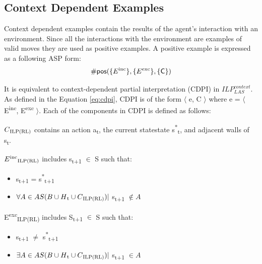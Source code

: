 \subsection{Context Dependent Examples}
Context dependent examples contain the results of the agent's interaction with an environment. 
Since all the interactions with the environment are examples of valid moves
they are used as positive examples. A positive example is expressed as a following ASP form:
\begin{equation}
\begin{split}
    \textsf{\#pos}(\{E\textsuperscript{inc}\}, \{E\textsuperscript{exc}\}, \textsf{\{C\}})
\end{split}
\end{equation}

It is equivalent to context-dependent partial interpretation (CDPI) in  $ILP_{LAS}^{context}$. 
As defined in the Equation \ref{eq:cdpi}, CDPI is of the form $\langle$ e, C $\rangle$ where e = $\langle$ E\textsuperscript{inc}, E\textsuperscript{exc} $\rangle$. 
Each of the components in CDPI is defined as follows:

\begin{defn}\label{def:ILPRL_context}
$C\textsubscript{ILP(RL)}$ contains an action a\textsubscript{t}, the current statestate s\textsuperscript{*}\textsubscript{t}, and adjacent walls of s\textsubscript{t}.
\label{def:context}
\end{defn}

\begin{defn} \label{def:ILPRL_inc}
$E\textsuperscript{inc}\textsubscript{ILP(RL)}$ includes s\textsubscript{t+1} $\in$ S such that:
\begin{itemize}
\item s\textsubscript{t+1} = s\textsuperscript{*}\textsubscript{t+1}
\item $ \forall A \in AS(B \cup H\textsubscript{t} \cup C\textsubscript{ILP(RL)})|$ s\textsubscript{t+1} $\not\in A$
\end{itemize}
\end{defn}

\begin{defn} \label{def:ILPRL_exc}
E\textsuperscript{exc}\textsubscript{ILP(RL)} includes S\textsubscript{t+1} $\in$ S such that:
\begin{itemize}
\item s\textsubscript{t+1} $\neq$ s\textsuperscript{*}\textsubscript{t+1}
\item $ \exists A \in AS(B \cup H\textsubscript{t} \cup C\textsubscript{ILP(RL)})|$ s\textsubscript{t+1} $\in A$
\end{itemize}
\end{defn}


